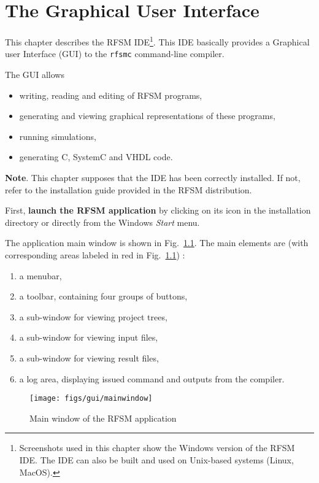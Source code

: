 \chapter{The Graphical User Interface}
\label{cha:gui}

This chapter describes the RFSM IDE\footnote{Screenshots used in this chapter show the Windows
  version of the RFSM IDE. The IDE can also be built and used on Unix-based systems (Linux,
  MacOS).}. This IDE basically provides a Graphical user Interface (GUI) to the \verb|rfsmc|
command-line compiler.

\medskip
The GUI allows
\begin{itemize}
\item writing, reading and editing of RFSM programs,
\item generating and viewing graphical representations of these programs,
\item running simulations,
\item generating C, SystemC and VHDL code.
\end{itemize}

\medskip
\textbf{Note}. This chapter supposes that the IDE has been correctly installed. If not, refer to the
installation guide provided in the RFSM distribution.

\medskip
First, \textbf{launch the RFSM application} by clicking on its icon in the installation directory or
directly from the Windows \emph{Start} menu. 

\medskip
The application main window is shown in Fig.~\ref{fig:main-window}. 
The main elements are (with corresponding areas labeled in red in Fig.~\ref{fig:main-window}) :
\begin{enumerate}
\item a menubar,
\item a toolbar, containing four groups of buttons,
\item a sub-window for viewing project trees,
\item a sub-window for viewing input files,
\item a sub-window for viewing result files,
\item a log area, displaying issued command and outputs from the compiler.
\end{enumerate}

\begin{figure}[h]
  \centering
  \texttt{[image: figs/gui/mainwindow]}
  \caption{Main window of the RFSM application}
  \label{fig:main-window}
\end{figure}


